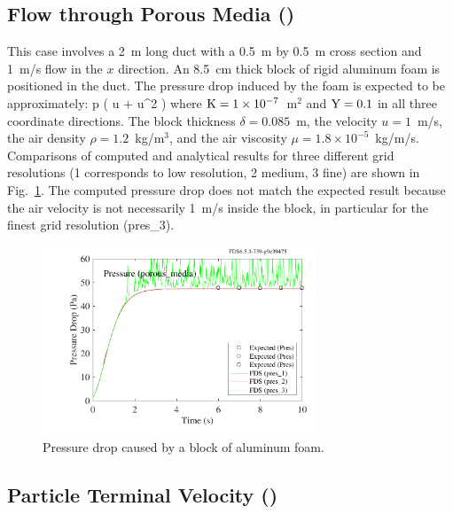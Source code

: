 \documentclass[11pt]{book}
\begin{document}
\subsection{Flow through Porous Media (\texorpdfstring{}{porous\_media})}
\label{porous_media}

This case involves a 2~m long duct with a 0.5~m by 0.5~m cross section and 1~m/s flow in the $x$ direction. An 8.5~cm thick block of rigid aluminum foam is positioned in the duct. The pressure drop induced by the foam is expected to be approximately:
\be
   \Delta p \approx \delta \left(  u \; + \; \rho {} u^2 \right)
\ee
where ${\rm K}=1 \times 10^{-7}$~m$^2$ and ${\rm Y}=0.1$ in all three coordinate directions. The block thickness $\delta=0.085$~m, the velocity $u=1$~m/s, the air density $\rho=1.2$~kg/m$^3$, and the air viscosity $\mu=1.8 \times 10^{-5}$~kg/m/s. Comparisons of computed and analytical results for three different grid resolutions (1 corresponds to low resolution, 2 medium, 3 fine) are shown in Fig.~\ref{porous_media_plot}. The computed pressure drop does not match the expected result because the air velocity is not necessarily 1~m/s inside the block, in particular for the finest grid resolution (pres\_3).

\begin{figure}[ht]
\centering
\includegraphics[width=3.2in]{SCRIPT_FIGURES/porous_media}
\caption[Results of the  test case]{Pressure drop caused by a block of aluminum foam.}
\label{porous_media_plot}
\end{figure}




\subsection{Particle Terminal Velocity (\texorpdfstring{}{terminal\_velocity})}
\end{document}
